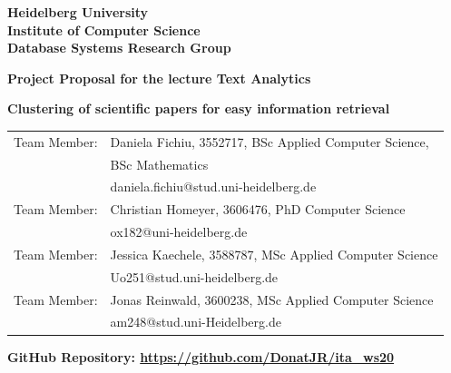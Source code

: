 \documentclass[
     12pt,         %
     a4paper,      %
     BCOR10mm,     %
     DIV14,        %
     ]{article}
\begin{document}
\begin{titlepage}


\vspace*{1cm}
\begin{center}
\vspace*{3cm}
\textbf{ 
\Large Heidelberg University\\
\smallskip
\Large Institute of Computer Science\\
\smallskip
\Large Database Systems Research Group\\
\smallskip
}

\vspace{3cm}

\textbf{\large Project Proposal for the lecture Text Analytics}

\vspace{0.5\baselineskip}
{\huge
\textbf{Clustering of scientific papers for easy information retrieval}
}
\end{center}

\vfill 

{\large
\begin{tabular}[l]{ll}
Team Member: & Daniela Fichiu, 3552717, BSc Applied Computer Science,\\
  & BSc Mathematics\\
  & daniela.fichiu@stud.uni-heidelberg.de\\
Team Member: & Christian Homeyer, 3606476, PhD Computer Science \\
  & ox182@uni-heidelberg.de\\
Team Member: & Jessica Kaechele, 3588787, MSc Applied Computer Science\\
  & Uo251@stud.uni-heidelberg.de\\
Team Member: & Jonas Reinwald, 3600238, MSc Applied Computer Science\\
  & am248@stud.uni-Heidelberg.de\\
  
\end{tabular}
}

{
  \textbf{GitHub Repository: \url{https://github.com/DonatJR/ita_ws20}}
}

\end{titlepage}





\end{document}
